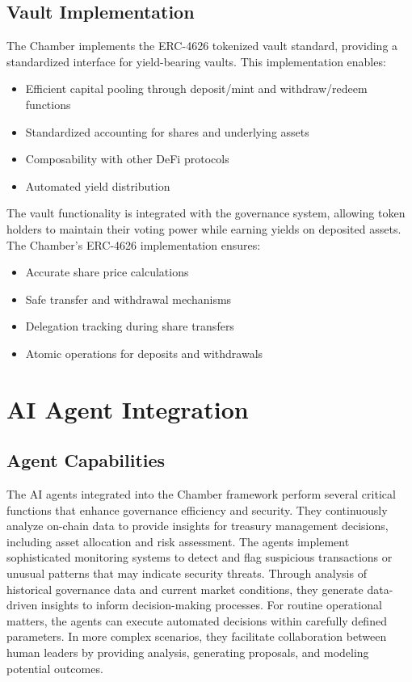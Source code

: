 \documentclass[12pt]{article}
\begin{document}
\subsection{Vault Implementation}
The Chamber implements the ERC-4626 tokenized vault standard, providing a standardized interface for yield-bearing vaults. This implementation enables:
\begin{itemize}
    \item Efficient capital pooling through deposit/mint and withdraw/redeem functions
    \item Standardized accounting for shares and underlying assets
    \item Composability with other DeFi protocols
    \item Automated yield distribution
\end{itemize}

The vault functionality is integrated with the governance system, allowing token holders to maintain their voting power while earning yields on deposited assets. The Chamber's ERC-4626 implementation ensures:
\begin{itemize}
    \item Accurate share price calculations
    \item Safe transfer and withdrawal mechanisms
    \item Delegation tracking during share transfers
    \item Atomic operations for deposits and withdrawals
\end{itemize}

\section{AI Agent Integration}

\subsection{Agent Capabilities}
The AI agents integrated into the Chamber framework perform several critical functions that enhance governance efficiency and security. They continuously analyze on-chain data to provide insights for treasury management decisions, including asset allocation and risk assessment. The agents implement sophisticated monitoring systems to detect and flag suspicious transactions or unusual patterns that may indicate security threats. Through analysis of historical governance data and current market conditions, they generate data-driven insights to inform decision-making processes. For routine operational matters, the agents can execute automated decisions within carefully defined parameters. In more complex scenarios, they facilitate collaboration between human leaders by providing analysis, generating proposals, and modeling potential outcomes.
\end{document}
